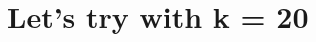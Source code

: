 \documentclass[11pt]{article}
\begin{document}
    \begin{center}
    \end{center}
    { \hspace*{\fill} \\}
    
    \begin{center}
    \end{center}
    { \hspace*{\fill} \\}
    
    \section{Let's try with k = 20}\label{lets-try-with-k-20}
\end{document}
